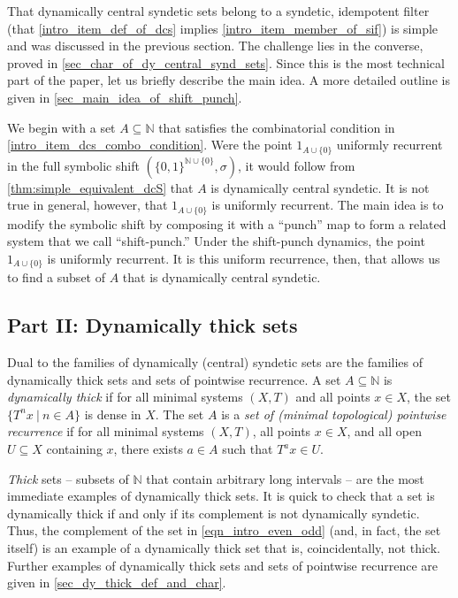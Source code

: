 \documentclass[letter,11pt]{article}
\theoremstyle{plain}
\theoremstyle{definition}
\theoremstyle{plain}
\theoremstyle{plain}
\numberwithin{equation}{section}
\newcommand{\N}{\mathbb{N}}
\begin{document}
That dynamically central syndetic sets belong to a syndetic, idempotent filter (that \eqref{intro_item_def_of_dcs} implies \eqref{intro_item_member_of_sif}) is simple and was discussed in the previous section. The challenge lies in the converse, proved in \cref{sec_char_of_dy_central_synd_sets}. Since this is the most technical part of the paper, let us briefly describe the main idea.  A more detailed outline is given in \cref{sec_main_idea_of_shift_punch}. 


We begin with a set $A \subseteq \N$ that satisfies the combinatorial condition in \eqref{intro_item_dcs_combo_condition}.  Were the point $1_{A \cup \{0\}}$ uniformly recurrent in the full symbolic shift $(\{0,1\}^{\N \cup \{0\}},\sigma)$, it would follow from \cref{thm:simple_equivalent_dcS} that $A$ is dynamically central syndetic.  It is not true in general, however, that $1_{A \cup \{0\}}$ is uniformly recurrent.  The main idea is to modify the symbolic shift by composing it with a ``punch'' map to form a related system that we call ``shift-punch.''  Under the shift-punch dynamics, the point $1_{A \cup \{0\}}$ is uniformly recurrent.  It is this uniform recurrence, then, that allows us to find a subset of $A$ that is dynamically central syndetic.


\subsection{Part II: Dynamically thick sets}
\label{sec_intro_part_two}

Dual to the families of dynamically (central) syndetic sets are the families of dynamically thick sets and sets of pointwise recurrence.  A set $A \subseteq \N$ is \emph{dynamically thick} if for all minimal systems $(X,T)$ and all points $x \in X$, the set $\{T^n x \ | \ n \in A\}$ is dense in $X$.  The set $A$ is a \emph{set of (minimal topological) pointwise recurrence} if for all minimal systems $(X,T)$, all points $x \in X$, and all open $U \subseteq X$ containing $x$, there exists $a \in A$ such that $T^a x \in U$.

\emph{Thick} sets -- subsets of $\N$ that contain arbitrary long intervals -- are the most immediate examples of dynamically thick sets.  It is quick to check that a set is dynamically thick if and only if its complement is not dynamically syndetic.  Thus, the complement of the set in \eqref{eqn_intro_even_odd} (and, in fact, the set itself) is an example of a dynamically thick set that is, coincidentally, not thick.  Further examples of dynamically thick sets and sets of pointwise recurrence are given in \cref{sec_dy_thick_def_and_char}.
\end{document}
